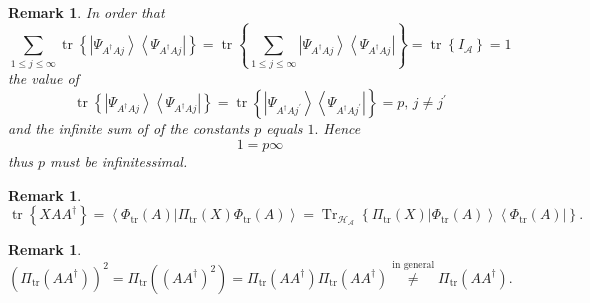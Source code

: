 \documentclass[aps,preprint]{revtex4}%
\newtheorem{remark}[theorem]{Remark}
\begin{document}
\begin{remark}
In order that
\begin{equation}
\sum_{1\leq j\leq\infty}\operatorname*{tr}\left\{  \left\vert \Psi
_{A^{\dagger}Aj}\right\rangle \left\langle \Psi_{A^{\dagger}Aj}\right\vert
\right\}  =\operatorname*{tr}\left\{  \sum_{1\leq j\leq\infty}\left\vert
\Psi_{A^{\dagger}Aj}\right\rangle \left\langle \Psi_{A^{\dagger}Aj}\right\vert
\right\}  =\operatorname*{tr}\left\{  I_{\mathcal{A}}\right\}  =1
\end{equation}
the value of
\begin{equation}
\operatorname*{tr}\left\{  \left\vert \Psi_{A^{\dagger}Aj}\right\rangle
\left\langle \Psi_{A^{\dagger}Aj}\right\vert \right\}  =\operatorname*{tr}%
\left\{  \left\vert \Psi_{A^{\dagger}Aj^{\prime}}\right\rangle \left\langle
\Psi_{A^{\dagger}Aj^{\prime}}\right\vert \right\}  =p,\,j\neq j^{\prime}%
\end{equation}
and the infinite sum of of the constants $p$ equals $1.$ Hence
\begin{equation}
1=p\infty
\end{equation}
thus $p$ must be infinitessimal. 
\end{remark}

\begin{remark}%
\begin{equation}
\operatorname*{tr}\left\{  XAA^{\dagger}\right\}  =\left\langle \left.
\Phi_{\operatorname*{tr}}\left(  A\right)  \right\vert \Pi_{\operatorname*{tr}%
}\left(  X\right)  \Phi_{\operatorname*{tr}}\left(  A\right)  \right\rangle
=\operatorname{Tr}_{\mathcal{H}_{\mathcal{A}}}\left\{  \Pi_{\operatorname*{tr}%
}\left(  X\right)  \left\vert \Phi_{\operatorname*{tr}}\left(  A\right)
\right\rangle \left\langle \Phi_{\operatorname*{tr}}\left(  A\right)
\right\vert \right\}  .
\end{equation}

\end{remark}

\begin{remark}%
\begin{equation}
\left(  \overset{}{\Pi_{\operatorname*{tr}}\left(  AA^{\dagger}\right)
}\right)  ^{2}=\Pi_{\operatorname*{tr}}\left(  \left(  AA^{\dagger}\right)
^{2}\right)  =\Pi_{\operatorname*{tr}}\left(  AA^{\dagger}\right)
\Pi_{\operatorname*{tr}}\left(  AA^{\dagger}\right)  \overset{\text{in
general}}{\neq}\Pi_{\operatorname*{tr}}\left(  AA^{\dagger}\right)  .
\end{equation}

\end{remark}
\end{document}
